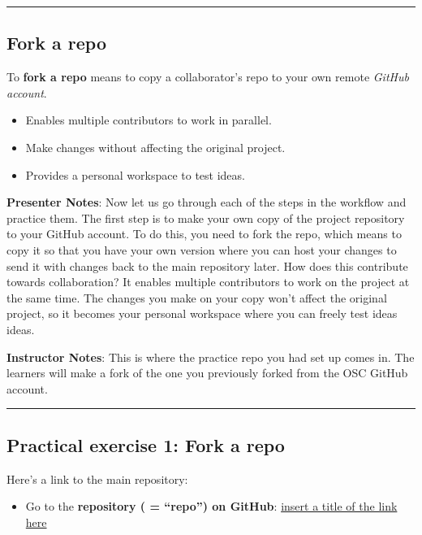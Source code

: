 \documentclass[
  letterpaper,
  DIV=11,
  numbers=noendperiod]{scrartcl}
\providecommand{\tightlist}{%
  \setlength{\itemsep}{0pt}\setlength{\parskip}{0pt}}
\begin{document}
\begin{center}\rule{0.5\linewidth}{0.5pt}\end{center}

\subsection{Fork a repo}\label{fork-a-repo}

To \textbf{fork a repo} means to copy a collaborator's repo to your own
remote \emph{GitHub account}.

\begin{itemize}
\tightlist
\item
  Enables multiple contributors to work in parallel.
\item
  Make changes without affecting the original project.
\item
  Provides a personal workspace to test ideas.
\end{itemize}

\textbf{Presenter Notes}: Now let us go through each of the steps in the
workflow and practice them. The first step is to make your own copy of
the project repository to your GitHub account. To do this, you need to
fork the repo, which means to copy it so that you have your own version
where you can host your changes to send it with changes back to the main
repository later. How does this contribute towards collaboration? It
enables multiple contributors to work on the project at the same time.
The changes you make on your copy won't affect the original project, so
it becomes your personal workspace where you can freely test ideas
ideas.

\textbf{Instructor Notes}: This is where the practice repo you had set
up comes in. The learners will make a fork of the one you previously
forked from the OSC GitHub account.

\begin{center}\rule{0.5\linewidth}{0.5pt}\end{center}

\subsection{Practical exercise 1: Fork a
repo}\label{practical-exercise-1-fork-a-repo}

Here's a link to the main repository:

\begin{itemize}
\tightlist
\item[$\square$]
  Go to the \textbf{repository ( = ``repo'') on GitHub}:
  \href{insert\%20the\%20link\%20to\%20the\%20practice\%20reposiory\%20here}{insert
  a title of the link here}
\end{itemize}
\end{document}
